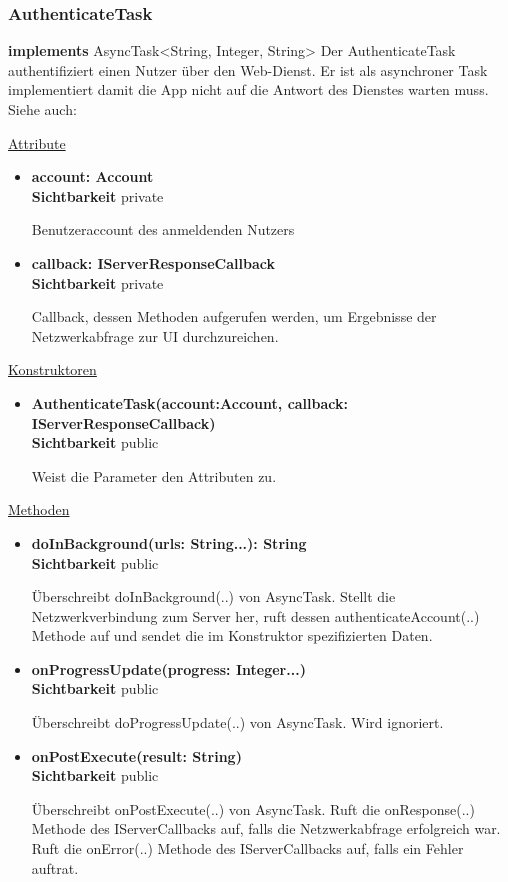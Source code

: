 \subsubsection{AuthenticateTask} \label{app:klasse:AuthenticateTask}
\textbf{implements} AsyncTask<String, Integer, String> \newline
Der AuthenticateTask authentifiziert einen Nutzer über den Web-Dienst. Er ist als asynchroner Task implementiert damit die App nicht auf die Antwort des Dienstes warten muss.\newline
Siehe auch:  \newline

\underline{Attribute}
\begin{itemize}
\itemsep0pt
\item \textbf{account: Account} \hfill\\ 
\textbf{Sichtbarkeit} private

Benutzeraccount des anmeldenden Nutzers

\item \textbf{callback: IServerResponseCallback} \hfill\\ 
\textbf{Sichtbarkeit} private

Callback, dessen Methoden aufgerufen werden, um Ergebnisse der Netzwerkabfrage zur UI durchzureichen.
\end{itemize}

\underline{Konstruktoren}
\begin{itemize}
\itemsep0pt
\item \textbf{AuthenticateTask(account:Account, callback: IServerResponseCallback)} \hfill\\
\textbf{Sichtbarkeit} public

Weist die Parameter den Attributen zu.
\end{itemize}

\underline{Methoden}
\begin{itemize}
\itemsep0pt
\item \textbf{doInBackground(urls: String...): String}\hfill\\
\textbf{Sichtbarkeit} public

Überschreibt doInBackground(..) von AsyncTask. Stellt die Netzwerkverbindung zum Server her, ruft dessen authenticateAccount(..) Methode auf und sendet die im Konstruktor spezifizierten Daten.

\item \textbf{onProgressUpdate(progress: Integer...)}\hfill\\
\textbf{Sichtbarkeit} public

Überschreibt doProgressUpdate(..) von AsyncTask. Wird ignoriert.

\item \textbf{onPostExecute(result: String)}\hfill\\
\textbf{Sichtbarkeit} public

Überschreibt onPostExecute(..) von AsyncTask. Ruft die onResponse(..) Methode des IServerCallbacks auf, falls die Netzwerkabfrage erfolgreich war. Ruft die onError(..) Methode des IServerCallbacks auf, falls ein Fehler auftrat.
\end{itemize}